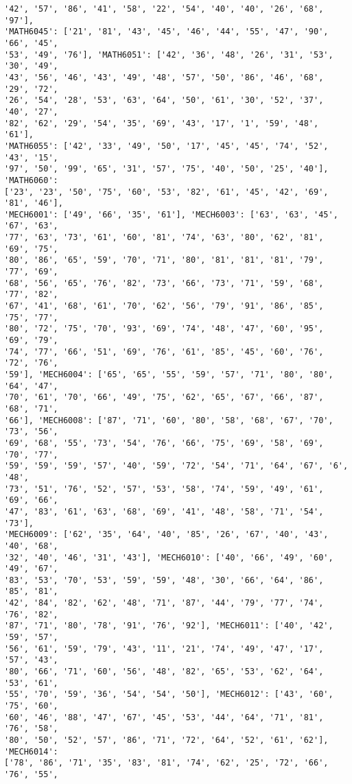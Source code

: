 \documentclass[11pt]{article}
\begin{document}
\begin{Verbatim}[commandchars=\\\{\}]
'42', '57', '86', '41', '58', '22', '54', '40', '40', '26', '68', '97'],
'MATH6045': ['21', '81', '43', '45', '46', '44', '55', '47', '90', '66', '45',
'53', '49', '76'], 'MATH6051': ['42', '36', '48', '26', '31', '53', '30', '49',
'43', '56', '46', '43', '49', '48', '57', '50', '86', '46', '68', '29', '72',
'26', '54', '28', '53', '63', '64', '50', '61', '30', '52', '37', '40', '27',
'82', '62', '29', '54', '35', '69', '43', '17', '1', '59', '48', '61'],
'MATH6055': ['42', '33', '49', '50', '17', '45', '45', '74', '52', '43', '15',
'97', '50', '99', '65', '31', '57', '75', '40', '50', '25', '40'], 'MATH6060':
['23', '23', '50', '75', '60', '53', '82', '61', '45', '42', '69', '81', '46'],
'MECH6001': ['49', '66', '35', '61'], 'MECH6003': ['63', '63', '45', '67', '63',
'77', '63', '73', '61', '60', '81', '74', '63', '80', '62', '81', '69', '75',
'80', '86', '65', '59', '70', '71', '80', '81', '81', '81', '79', '77', '69',
'68', '56', '65', '76', '82', '73', '66', '73', '71', '59', '68', '77', '82',
'67', '41', '68', '61', '70', '62', '56', '79', '91', '86', '85', '75', '77',
'80', '72', '75', '70', '93', '69', '74', '48', '47', '60', '95', '69', '79',
'74', '77', '66', '51', '69', '76', '61', '85', '45', '60', '76', '72', '76',
'59'], 'MECH6004': ['65', '65', '55', '59', '57', '71', '80', '80', '64', '47',
'70', '61', '70', '66', '49', '75', '62', '65', '67', '66', '87', '68', '71',
'66'], 'MECH6008': ['87', '71', '60', '80', '58', '68', '67', '70', '73', '56',
'69', '68', '55', '73', '54', '76', '66', '75', '69', '58', '69', '70', '77',
'59', '59', '59', '57', '40', '59', '72', '54', '71', '64', '67', '6', '48',
'73', '51', '76', '52', '57', '53', '58', '74', '59', '49', '61', '69', '66',
'47', '83', '61', '63', '68', '69', '41', '48', '58', '71', '54', '73'],
'MECH6009': ['62', '35', '64', '40', '85', '26', '67', '40', '43', '40', '68',
'32', '40', '46', '31', '43'], 'MECH6010': ['40', '66', '49', '60', '49', '67',
'83', '53', '70', '53', '59', '59', '48', '30', '66', '64', '86', '85', '81',
'42', '84', '82', '62', '48', '71', '87', '44', '79', '77', '74', '76', '82',
'87', '71', '80', '78', '91', '76', '92'], 'MECH6011': ['40', '42', '59', '57',
'56', '61', '59', '79', '43', '11', '21', '74', '49', '47', '17', '57', '43',
'80', '66', '71', '60', '56', '48', '82', '65', '53', '62', '64', '53', '61',
'55', '70', '59', '36', '54', '54', '50'], 'MECH6012': ['43', '60', '75', '60',
'60', '46', '88', '47', '67', '45', '53', '44', '64', '71', '81', '76', '58',
'80', '50', '52', '57', '86', '71', '72', '64', '52', '61', '62'], 'MECH6014':
['78', '86', '71', '35', '83', '81', '74', '62', '25', '72', '66', '76', '55',

\end{Verbatim}
\end{document}
